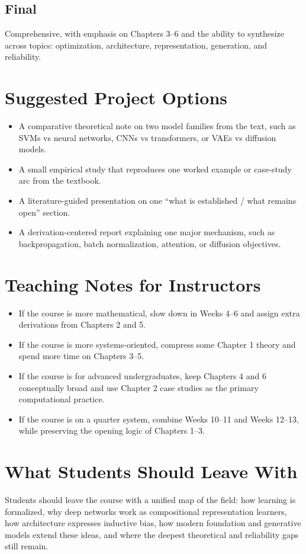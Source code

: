 \documentclass[11pt]{article}
\newcommand{\infobox}[1]{%
  \vspace{0.4em}
  \noindent
  \colorbox{lightaccent}{\parbox{\dimexpr\linewidth-2\fboxsep\relax}{#1}}
  \vspace{0.4em}
}
\begin{document}
\subsection*{Final}
Comprehensive, with emphasis on Chapters 3--6 and the ability to synthesize across topics: optimization, architecture, representation, generation, and reliability.

\section{Suggested Project Options}
\begin{itemize}
  \item A comparative theoretical note on two model families from the text, such as SVMs vs neural networks, CNNs vs transformers, or VAEs vs diffusion models.
  \item A small empirical study that reproduces one worked example or case-study arc from the textbook.
  \item A literature-guided presentation on one ``what is established / what remains open'' section.
  \item A derivation-centered report explaining one major mechanism, such as backpropagation, batch normalization, attention, or diffusion objectives.
\end{itemize}

\section{Teaching Notes for Instructors}
\begin{itemize}
  \item If the course is more mathematical, slow down in Weeks 4--6 and assign extra derivations from Chapters 2 and 5.
  \item If the course is more systems-oriented, compress some Chapter 1 theory and spend more time on Chapters 3--5.
  \item If the course is for advanced undergraduates, keep Chapters 4 and 6 conceptually broad and use Chapter 2 case studies as the primary computational practice.
  \item If the course is on a quarter system, combine Weeks 10--11 and Weeks 12--13, while preserving the opening logic of Chapters 1--3.
\end{itemize}

\section{What Students Should Leave With}
\infobox{Students should leave the course with a unified map of the field: how learning is formalized, why deep networks work as compositional representation learners, how architecture expresses inductive bias, how modern foundation and generative models extend these ideas, and where the deepest theoretical and reliability gaps still remain.}
\end{document}
